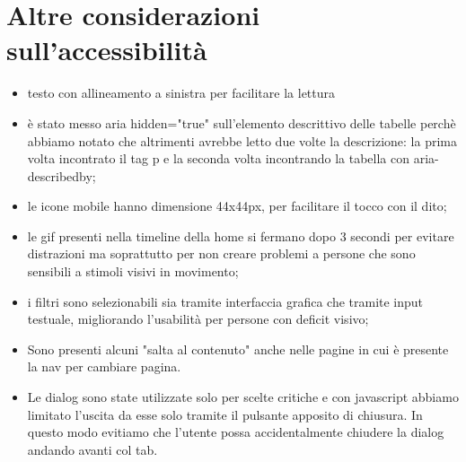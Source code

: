 \section{Altre considerazioni sull'accessibilità}
\label{sec:accessibilita}
\begin{itemize}
    \item testo con allineamento a sinistra per facilitare la lettura
    \item è stato messo aria hidden="true" sull'elemento descrittivo delle tabelle perchè abbiamo notato che altrimenti avrebbe letto due volte la descrizione: la prima volta incontrato il tag p e la seconda volta incontrando la tabella con aria-describedby;
    \item le icone mobile hanno dimensione 44x44px, per facilitare il tocco con il dito;
    \item le gif presenti nella timeline della home si fermano dopo 3 secondi per evitare distrazioni ma soprattutto per non creare problemi a persone che sono sensibili a stimoli visivi in movimento;
    \item i filtri sono selezionabili sia tramite interfaccia grafica che tramite input testuale, migliorando l'usabilità per persone con deficit visivo;
    \item Sono presenti alcuni "salta al contenuto" anche nelle pagine in cui è presente la nav per cambiare pagina.
    \item Le dialog sono state utilizzate solo per scelte critiche e con javascript abbiamo limitato l'uscita da esse solo tramite il pulsante apposito di chiusura. In questo modo evitiamo che l'utente possa accidentalmente chiudere la dialog andando avanti col tab.


\end{itemize}
